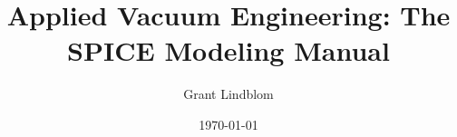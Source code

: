 \documentclass[11pt, letterpaper, openright]{book}
\begin{document}
\frontmatter

\title{Applied Vacuum Engineering: The SPICE Modeling Manual}
\author{Grant Lindblom}
\date{\today}
\maketitle

\tableofcontents

\mainmatter

\setcounter{chapter}{0}




\backmatter
\end{document}

